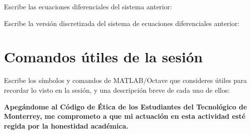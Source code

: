 \documentclass[spanish, 10pt]{article}
\begin{document}
\pagebreak

Escribe las ecuaciones diferenciales del sistema anterior:

\vspace{2in}

Escribe la versión discretizada del sistema de ecuaciones diferenciales anterior:

\vspace{2in}

\section{Comandos útiles de la sesión}

Escribe los símbolos y comandos de MATLAB/Octave que consideres útiles para recordar lo visto en la sesión, y una descripción breve de cada uno de ellos:

\vfill

\textbf{Apegándome al Código de Ética de los Estudiantes del Tecnológico de Monterrey, me comprometo a que mi actuación en esta actividad esté regida por la honestidad académica.}
\end{document}
